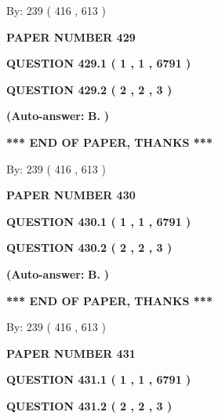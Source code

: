 \documentclass[12pt]{article}
\begin{document}
   
\hspace{1.0in} By: 
 239 ( 416 ,  613 )
   
   
   
   
\newpage 
\setcounter{page}{ 
   429001 } 
   
   
 {\textbf{ \Large{ PAPER NUMBER  429  }}}
   
   
   
   
  
  
{\textbf{\large{QUESTION
429.1 
 ( 1 , 1 , 6791 )
}}}
  
  
{\textbf{\large{QUESTION
429.2 
 ( 2 , 2 , 3 )
}}}
 
 
{\textbf{(Auto-answer:}}
{\textbf{\large{
B.}}}
{\textbf{)}}
 
 
   
   
   
   
\vspace{1.0in} 
{\textbf{\large{ *** END OF PAPER, THANKS *** }}} 
   
   
\hspace{1.0in} By: 
 239 ( 416 ,  613 )
   
   
   
   
\newpage 
\setcounter{page}{ 
   430001 } 
   
   
 {\textbf{ \Large{ PAPER NUMBER  430  }}}
   
   
   
   
  
  
{\textbf{\large{QUESTION
430.1 
 ( 1 , 1 , 6791 )
}}}
  
  
{\textbf{\large{QUESTION
430.2 
 ( 2 , 2 , 3 )
}}}
 
 
{\textbf{(Auto-answer:}}
{\textbf{\large{
B.}}}
{\textbf{)}}
 
 
   
   
   
   
\vspace{1.0in} 
{\textbf{\large{ *** END OF PAPER, THANKS *** }}} 
   
   
\hspace{1.0in} By: 
 239 ( 416 ,  613 )
   
   
   
   
\newpage 
\setcounter{page}{ 
   431001 } 
   
   
 {\textbf{ \Large{ PAPER NUMBER  431  }}}
   
   
   
   
  
  
{\textbf{\large{QUESTION
431.1 
 ( 1 , 1 , 6791 )
}}}
  
  
{\textbf{\large{QUESTION
431.2 
 ( 2 , 2 , 3 )
}}}
 
\end{document}
